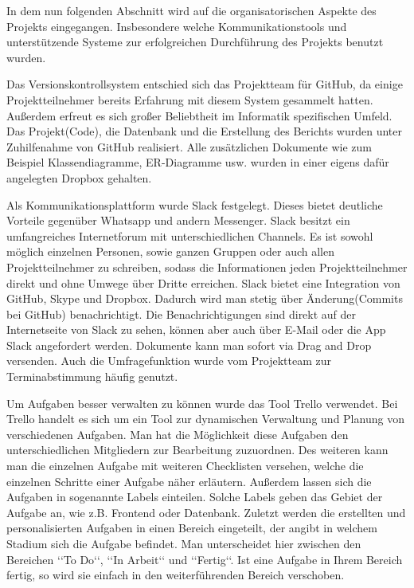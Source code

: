  
 In dem nun folgenden Abschnitt wird auf die organisatorischen Aspekte des Projekts eingegangen. Insbesondere welche Kommunikationstools und unterstützende Systeme zur erfolgreichen Durchführung des Projekts benutzt wurden.

Das Versionskontrollsystem entschied sich das Projektteam für GitHub, da einige Projektteilnehmer bereits Erfahrung mit diesem System gesammelt hatten. Außerdem erfreut es sich großer Beliebtheit im Informatik spezifischen Umfeld. Das Projekt(Code), die Datenbank und die Erstellung des Berichts wurden unter Zuhilfenahme von GitHub realisiert. Alle zusätzlichen Dokumente wie zum Beispiel Klassendiagramme, ER-Diagramme usw. wurden in einer eigens dafür angelegten Dropbox gehalten.

Als Kommunikationsplattform wurde Slack festgelegt. Dieses bietet deutliche Vorteile gegenüber Whatsapp und andern Messenger. Slack besitzt ein umfangreiches Internetforum mit unterschiedlichen Channels. Es ist sowohl möglich einzelnen Personen, sowie ganzen Gruppen oder auch allen Projektteilnehmer zu schreiben, sodass die Informationen jeden Projektteilnehmer direkt und ohne Umwege über Dritte erreichen. Slack bietet eine Integration von GitHub, Skype und Dropbox. Dadurch wird man stetig über Änderung(Commits bei GitHub) benachrichtigt. Die Benachrichtigungen sind direkt auf der Internetseite von Slack zu sehen, können aber auch über E-Mail oder die App Slack angefordert werden. Dokumente kann man sofort via Drag and Drop versenden. Auch die Umfragefunktion wurde vom Projektteam zur Terminabstimmung häufig genutzt.

Um Aufgaben besser verwalten zu können wurde das Tool Trello verwendet. Bei Trello handelt es sich um ein Tool zur dynamischen Verwaltung und Planung von verschiedenen Aufgaben. Man hat die Möglichkeit diese Aufgaben den unterschiedlichen Mitgliedern zur Bearbeitung zuzuordnen. Des weiteren kann man die einzelnen Aufgabe mit weiteren Checklisten versehen, welche die einzelnen Schritte einer Aufgabe näher erläutern. Außerdem lassen sich die Aufgaben in sogenannte Labels einteilen. Solche Labels geben das Gebiet der Aufgabe an, wie z.B. Frontend oder Datenbank.
Zuletzt werden die erstellten und personalisierten Aufgaben in einen Bereich eingeteilt, der angibt in welchem Stadium sich die Aufgabe befindet. Man unterscheidet hier zwischen den Bereichen ‘‘To Do‘‘, ‘‘In Arbeit‘‘ und ‘‘Fertig‘‘. Ist eine Aufgabe in Ihrem Bereich fertig, so wird sie einfach in den weiterführenden Bereich verschoben.

